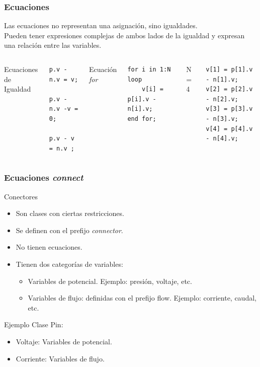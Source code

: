 \begin{frame}[fragile,t]
\frametitle{Ecuaciones} 
\begin{block}{}
Las ecuaciones no representan una asignación, sino igualdades.\\ Pueden tener expresiones complejas de ambos lados de la igualdad y expresan una relación entre las variables.
\end{block}
\vspace{0.1cm}
\begin{columns}  
\column[t]{4cm}
Ecuaciones de Igualdad
\vspace{0.2cm}
\begin{lstlisting}[style=base]
p.v - n.v = v;

p.v - n.v -v = 0;

p.v - v = n.v ;

\end{lstlisting} 
\column[t]{5cm}
\pause
Ecuación \textit{for}
\vspace{0.2cm}
\begin{lstlisting}[style=base]
for i in 1:N loop
    v[i] = p[i].v - n[i].v; 
end for;
\end{lstlisting} 
\column[t]{4cm} 
\pause
N = 4
\vspace{0.2cm}
\begin{lstlisting}[style=base]
v[1] = p[1].v - n[1].v;       
v[2] = p[2].v - n[2].v;
v[3] = p[3].v - n[3].v;
v[4] = p[4].v - n[4].v;
\end{lstlisting} 
\end{columns}
\end{frame}

\begin{frame}[fragile]
\frametitle{Ecuaciones \textit{connect}} 
\begin{block}{Conectores}
\begin{itemize}
\item Son clases con ciertas restricciones.
\item Se definen con el prefijo \textit{connector}.
\item No tienen ecuaciones.
\item Tienen dos categorías de variables:
    \begin{itemize}
        \item Variables de potencial. Ejemplo: presión, voltaje, etc. 
        \item Variables de flujo: definidas con el prefijo flow. Ejemplo: corriente, caudal, etc.
    \end{itemize} 
\end{itemize}
\end{block}
\begin{block}{Ejemplo}
Clase Pin:
\begin{itemize}
    \item Voltaje: Variables de potencial.
    \item Corriente: Variables de flujo.
\end{itemize}
\end{block}
\end{frame}

